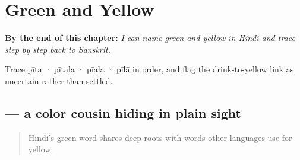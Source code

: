 
\chapter{Green and Yellow}
\label{ch:hi-green-and-yellow}

\begin{chapteropening}
\textbf{By the end of this chapter:} \emph{I can name green and yellow in Hindi and trace  step by step back to Sanskrit.}

Trace pīta · pītala · pīala · pīlā in order, and flag the drink-to-yellow link as uncertain rather than settled.
\end{chapteropening}

\section[\texorpdfstring{\hi{हरा} (harā)}{हरा (harā)}]{ — a color cousin hiding in plain sight}

\label{lesson:HI-C24-hara-pila}



\begin{quote}
Hindi's green word shares deep roots with words other languages use for yellow.
\end{quote}

